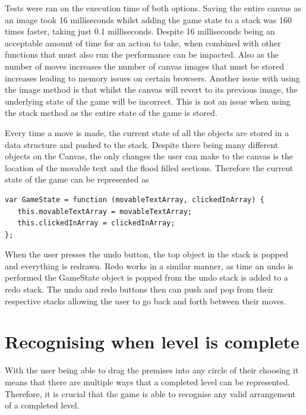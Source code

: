 \documentclass[12pt,a4paper]{report}
\begin{document}
Tests were ran on the execution time of both options. Saving the entire canvas as an image took 16 milliseconds whilst adding the game state to a stack was 160 times faster, taking just 0.1 milliseconds. Despite 16 milliseconds being an acceptable amount of time for an action to take, when combined with other functions that must also run the performance can be impacted. Also as the number of moves increases the number of canvas images that must be stored increases leading to memory issues on certain browsers. Another issue with using the image method is that whilst the canvas will revert to its previous image, the underlying state of the game will be incorrect. This is not an issue when using the stack method as the entire state of the game is stored.

Every time a move is made, the current state of all the objects are stored in a data structure and pushed to the stack. Despite there being many different objects on the Canvas, the only changes the user can make to the canvas is the location of the movable text and the flood filled sections. Therefore the current state of the game can be represented as
 
\begin{minipage}{\linewidth}
\begin{lstlisting}
var GameState = function (movableTextArray, clickedInArray) {
   this.movableTextArray = movableTextArray;
   this.clickedInArray = clickedInArray;
};
\end{lstlisting}
\end{minipage}

 When the user presses the undo button, the top object in the stack is popped and everything is redrawn. 
Redo works in a similar manner, as time an undo is performed the GameState object is popped from the undo stack is added to a redo stack. The undo and redo buttons then can push and pop from their respective stacks allowing the user to go back and forth between their moves.

\section{Recognising when level is complete}
With the user being able to drag the premises into any circle of their choosing it means that there are multiple ways that a completed level can be represented.
Therefore, it is crucial that the game is able to recognise any valid arrangement of a completed level.
\end{document}

